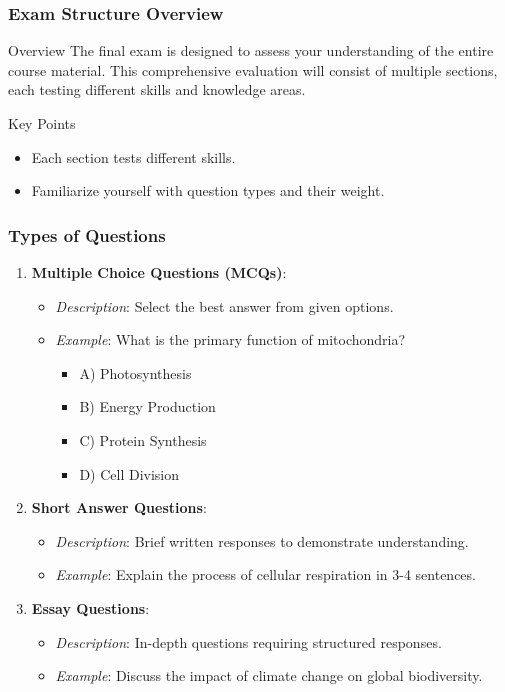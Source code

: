 \documentclass[aspectratio=169]{beamer}
\begin{document}
\begin{frame}[fragile]
    \frametitle{Exam Structure Overview}
    \begin{block}{Overview}
        The final exam is designed to assess your understanding of the entire course material.
        This comprehensive evaluation will consist of multiple sections, each testing different skills and knowledge areas.
    \end{block}
    \begin{block}{Key Points}
        \begin{itemize}
            \item Each section tests different skills.
            \item Familiarize yourself with question types and their weight.
        \end{itemize}
    \end{block}
\end{frame}

\begin{frame}[fragile]
    \frametitle{Types of Questions}
    \begin{enumerate}
        \item \textbf{Multiple Choice Questions (MCQs)}:
        \begin{itemize}
            \item \textit{Description}: Select the best answer from given options.
            \item \textit{Example}: What is the primary function of mitochondria?
            \begin{itemize}
                \item A) Photosynthesis
                \item B) Energy Production
                \item C) Protein Synthesis
                \item D) Cell Division
            \end{itemize}
        \end{itemize}

        \item \textbf{Short Answer Questions}:
        \begin{itemize}
            \item \textit{Description}: Brief written responses to demonstrate understanding.
            \item \textit{Example}: Explain the process of cellular respiration in 3-4 sentences.
        \end{itemize}

        \item \textbf{Essay Questions}:
        \begin{itemize}
            \item \textit{Description}: In-depth questions requiring structured responses.
            \item \textit{Example}: Discuss the impact of climate change on global biodiversity.
        \end{itemize}
    \end{enumerate}
\end{frame}
\end{document}
